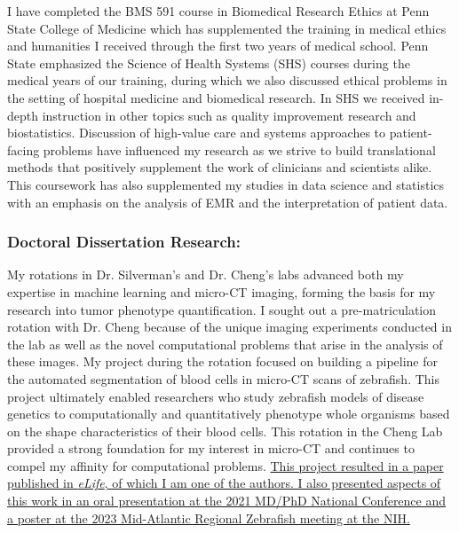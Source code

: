 \documentclass{NIHGrant}
\begin{document}
I have completed the BMS 591 course in Biomedical Research Ethics at Penn State College of Medicine which has supplemented the training in medical ethics and humanities I received through the first two years of medical school. Penn State emphasized the Science of Health Systems (SHS) courses during the medical years of our training, during which we also discussed ethical problems in the setting of hospital medicine and biomedical research. In SHS we received in-depth instruction in other topics such as quality improvement research and biostatistics. Discussion of high-value care and systems approaches to patient-facing problems have influenced my research as we strive to build translational methods that positively supplement the work of clinicians and scientists alike. This coursework has also supplemented my studies in data science and statistics with an emphasis on the analysis of EMR and the interpretation of patient data.

\subsubsection*{Doctoral Dissertation Research:}
My rotations in Dr. Silverman's and Dr. Cheng's labs advanced both my expertise in machine learning and micro-CT imaging, forming the basis for my research into tumor phenotype quantification. I sought out a pre-matriculation rotation with Dr. Cheng because of the unique imaging experiments conducted in the lab as well as the novel computational problems that arise in the analysis of these images. My project during the rotation focused on building a pipeline for the automated segmentation of blood cells in micro-CT scans of zebrafish. This project ultimately enabled researchers who study zebrafish models of disease genetics to computationally and quantitatively phenotype whole organisms based on the shape characteristics of their blood cells. This rotation in the Cheng Lab provided a strong foundation for my interest in micro-CT and continues to compel my affinity for computational problems. \uline{This project resulted in a paper published in \textit{eLife}, of which I am one of the authors. I also presented aspects of this work in an oral presentation at the 2021 MD/PhD National Conference and a poster at the 2023 Mid-Atlantic Regional Zebrafish meeting at the NIH.}
\end{document}
